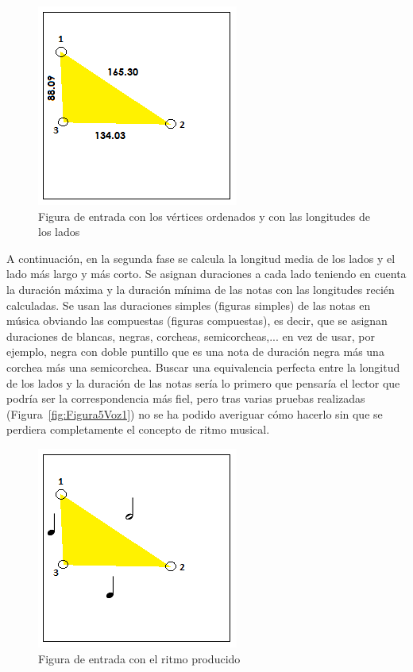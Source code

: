 		\begin{figure}[htbp]
		\centering
		\hspace*{0.0in}
		\includegraphics[scale=1.0]{graphics/simpletest1-F1.png}
		\caption{Figura de entrada con los vértices ordenados y con las longitudes de los lados}
		\label{fig:Figura1Voz1}
		\end{figure}

A continuación, en la segunda fase se calcula la longitud media de los lados y el lado más largo y más corto. Se asignan duraciones a cada lado teniendo en cuenta la duración máxima y la duración mínima de las notas con las longitudes recién calculadas. Se usan las duraciones simples (figuras simples) de las notas en música obviando las compuestas (figuras compuestas), es decir, que se asignan duraciones de blancas, negras, corcheas, semicorcheas,... en vez de usar, por ejemplo, negra con doble puntillo que es una nota de duración negra más una corchea más una semicorchea. Buscar una equivalencia perfecta entre la longitud de los lados y la duración de las notas sería lo primero que pensaría el lector que podría ser la correspondencia más fiel, pero tras varias pruebas realizadas (Figura~\ref{fig:Figura5Voz1}) no se ha podido averiguar cómo hacerlo sin que se perdiera completamente el concepto de ritmo musical.

		\begin{figure}[htbp]
		\centering
		\hspace*{0.0in}
		\includegraphics[scale=1.0]{graphics/simpletest1-F2.png}
		\caption{Figura de entrada con el ritmo producido}
		\label{fig:Figura2Voz1}
		\end{figure}


